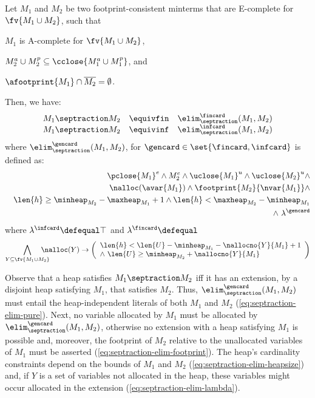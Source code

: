 \begin{lemma}\label{lemma:septraction-elim}
  Let $M_1$ and $M_2$ be two footprint-consistent minterms that are
  E-complete for $\fv{M_1 \cup M_2}$, such
  that \begin{inparaenum}[(a)]
  \item $M_1$ is A-complete for $\fv{M_1 \cup M_2}$,
  \item $M_2^a \cup M_2^p \subseteq \cclose{M_1^a \cup M_1^p}$, and 
  \item $\afootprint{M_1} \cap \overline{M_2} = \emptyset$\label{eq:footprint-const}.
  \end{inparaenum}
  Then, we have:
  \[\begin{array}{rcl}
  M_1 \septraction M_2 & \equivfin & \elim^\fincard_\septraction(M_1,M_2) \\ 
  M_1 \septraction M_2 & \equivinf & \elim^\infcard_\septraction(M_1,M_2)
  \end{array}\]
  where $\elim^\gencard_\septraction(M_1,M_2)$, for $\gencard \in
  \set{\fincard,\infcard}$ is defined as:
  \begin{eqnarray}
    && %
    {\pclose{M_1}}^e \wedge M_2^e \wedge {\uclose{M_1}}^u \wedge {\uclose{M_2}}^u \wedge 
    \label{eq:septraction-elim-pure} \\
    && \nalloc(\avar{M_1}) \wedge \footprint{M_2}{\nvar{M_1}} \wedge 
    \label{eq:septraction-elim-footprint} \\
    && \len{h} \geq \minheap_{M_2} - \maxheap_{M_1} + 1 \wedge 
    \len{h} < \maxheap_{M_2} - \minheap_{M_1} \label{eq:septraction-elim-heapsize} \\
    && \wedge~ \lambda^\gencard \label{eq:septraction-elim-lambda}
    \end{eqnarray}
  where \(\lambda^\infcard \defequal \top\)  and \(\lambda^\fincard \defequal\)
  \[\bigwedge_{\scriptstyle{Y \subseteq \fv{M_1 \cup M_2}}} \!\!\!\! \!\!\!\!
  \nalloc(Y) \rightarrow \left(\begin{array}{l}
  \len{h} < \len{U} - \minheap_{M_1} - \nallocno{Y}{M_1} + 1 \\
  \wedge~ \len{U} \geq \minheap_{M_2} + \nallocno{Y}{M_1}\end{array}\right)\]
\end{lemma}
Observe that a heap satisfies $M_1 \septraction M_2$ iff it has an
extension, by a disjoint heap satisfying $M_1$, that satisfies $M_2$.
Thus, $\elim^\gencard_\septraction(M_1,M_2)$ must entail the
heap-independent literals of both $M_1$ and $M_2$
(\ref{eq:septraction-elim-pure}). Next, no variable allocated by $M_1$
must be allocated by $\elim^\gencard_\septraction(M_1,M_2)$, otherwise
no extension with a heap satisfying $M_1$ is possible and, moreover,
the footprint of $M_2$ relative to the unallocated variables of $M_1$
must be asserted (\ref{eq:septraction-elim-footprint}). The heap's
cardinality constraints depend on the bounds of $M_1$ and $M_2$
(\ref{eq:septraction-elim-heapsize}) and, if $Y$ is a set of variables
not allocated in the heap, these variables might occur allocated in
the extension (\ref{eq:septraction-elim-lambda}).

